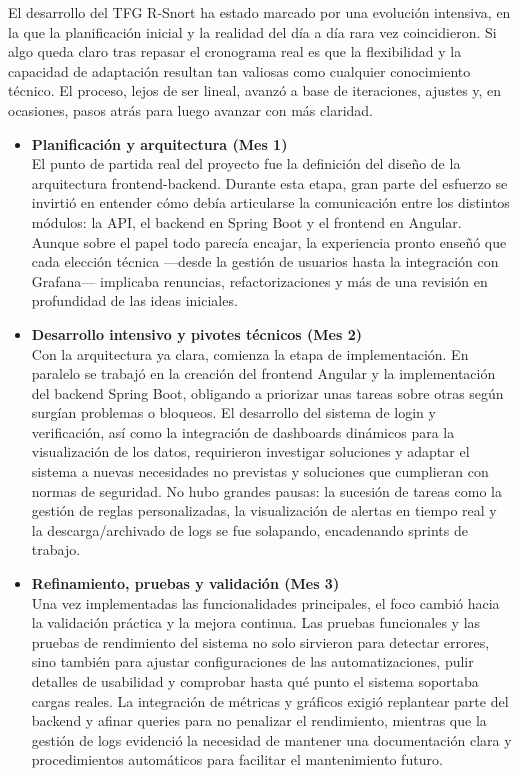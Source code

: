 \documentclass[11pt,a4paper,twoside]{report}
\begin{document}
El desarrollo del TFG R-Snort ha estado marcado por una evolución intensiva, en la que la planificación inicial y la realidad del día a día rara vez coincidieron. Si algo queda claro tras repasar el cronograma real es que la flexibilidad y la capacidad de adaptación resultan tan valiosas como cualquier conocimiento técnico. El proceso, lejos de ser lineal, avanzó a base de iteraciones, ajustes y, en ocasiones, pasos atrás para luego avanzar con más claridad.

\vspace{0.5em}

\begin{itemize}
	\item \textbf{Planificación y arquitectura (Mes 1)}\\
	\hspace*{1em}El punto de partida real del proyecto fue la definición del diseño de la arquitectura frontend-backend. Durante esta etapa, gran parte del esfuerzo se invirtió en entender cómo debía articularse la comunicación entre los distintos módulos: la API, el backend en Spring Boot y el frontend en Angular. Aunque sobre el papel todo parecía encajar, la experiencia pronto enseñó que cada elección técnica —desde la gestión de usuarios hasta la integración con Grafana— implicaba renuncias, refactorizaciones y más de una revisión en profundidad de las ideas iniciales.
	
	\item \textbf{Desarrollo intensivo y pivotes técnicos (Mes 2)}\\
	\hspace*{1em}Con la arquitectura ya clara, comienza la etapa de implementación. En paralelo se trabajó en la creación del frontend Angular y la implementación del backend Spring Boot, obligando a priorizar unas tareas sobre otras según surgían problemas o bloqueos. El desarrollo del sistema de login y verificación, así como la integración de dashboards dinámicos para la visualización de los datos, requirieron investigar soluciones y adaptar el sistema a nuevas necesidades no previstas y soluciones que cumplieran con normas de seguridad. No hubo grandes pausas: la sucesión de tareas como la gestión de reglas personalizadas, la visualización de alertas en tiempo real y la descarga/archivado de logs se fue solapando, encadenando sprints de trabajo.
	
	\item \textbf{Refinamiento, pruebas y validación (Mes 3)}\\
	\hspace*{1em}Una vez implementadas las funcionalidades principales, el foco cambió hacia la validación práctica y la mejora continua. Las pruebas funcionales y las pruebas de rendimiento del sistema no solo sirvieron para detectar errores, sino también para ajustar configuraciones de las automatizaciones, pulir detalles de usabilidad y comprobar hasta qué punto el sistema soportaba cargas reales. La integración de métricas y gráficos exigió replantear parte del backend y afinar queries para no penalizar el rendimiento, mientras que la gestión de logs evidenció la necesidad de mantener una documentación clara y procedimientos automáticos para facilitar el mantenimiento futuro.
	

\end{itemize}
\end{document}
